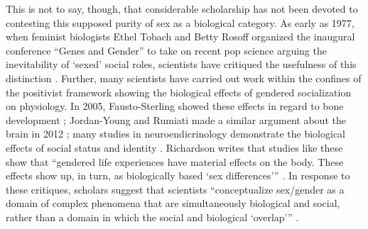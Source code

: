 This is not to say, though, that considerable scholarship has not been devoted to contesting this supposed purity of sex as a biological category. As early as 1977, when feminist biologists Ethel Tobach and Betty Rosoff organized the inaugural conference ``Genes and Gender'' to take on recent pop science arguing the inevitability of `sexed' social roles, scientists have critiqued the usefulness of this distinction \cite{tobach1994challenging}. Further, many scientists have carried out work within the confines of the positivist framework showing the biological effects of gendered socialization on physiology. In 2005, Fausto-Sterling showed these effects in regard to bone development \cite{fausto2005bare}; Jordan-Young and Rumiati made a similar argument about the brain in 2012 \cite{jordan2012hardwired}; many studies in neuroendicrinology demonstrate the biological effects of social status and identity \cite{booth2006testosterone, haneishi2007cortisol, van2006social}. Richardson writes that studies like these show that ``gendered life experiences have material effects on the body. These effects show up, in turn, as biologically based `sex differences'\thinspace'' \cite{richardson2013sex}. In response to these critiques, scholars suggest that scientists ``conceptualize sex/gender as a domain of complex phenomena that are simultaneously biological and social, rather than a domain in which the social and biological `overlap'\thinspace'' \cite{springer2012beyond}.

